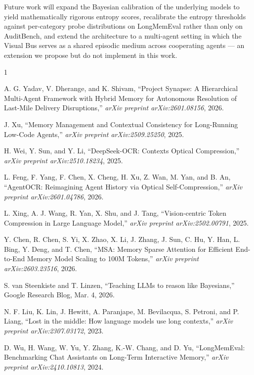 \documentclass[conference]{IEEEtran}
\begin{document}
Future work will expand the Bayesian calibration of the underlying models to yield mathematically rigorous entropy scores, recalibrate the entropy thresholds against per-category probe distributions on LongMemEval rather than only on AuditBench, and extend the architecture to a multi-agent setting in which the Visual Bus serves as a shared episodic medium across cooperating agents --- an extension we propose but do not implement in this work.


\begin{thebibliography}{1}

    A. G. Yadav, V. Dherange, and K. Shivam, ``Project Synapse: A Hierarchical Multi-Agent Framework with Hybrid Memory for Autonomous Resolution of Last-Mile Delivery Disruptions,'' \textit{arXiv preprint arXiv:2601.08156}, 2026.

    J. Xu, ``Memory Management and Contextual Consistency for Long-Running Low-Code Agents,'' \textit{arXiv preprint arXiv:2509.25250}, 2025.

    H. Wei, Y. Sun, and Y. Li, ``DeepSeek-OCR: Contexts Optical Compression,'' \textit{arXiv preprint arXiv:2510.18234}, 2025.

    L. Feng, F. Yang, F. Chen, X. Cheng, H. Xu, Z. Wan, M. Yan, and B. An, ``AgentOCR: Reimagining Agent History via Optical Self-Compression,'' \textit{arXiv preprint arXiv:2601.04786}, 2026.

    L. Xing, A. J. Wang, R. Yan, X. Shu, and J. Tang, ``Vision-centric Token Compression in Large Language Model,'' \textit{arXiv preprint arXiv:2502.00791}, 2025.

    Y. Chen, R. Chen, S. Yi, X. Zhao, X. Li, J. Zhang, J. Sun, C. Hu, Y. Han, L. Bing, Y. Deng, and T. Chen, ``MSA: Memory Sparse Attention for Efficient End-to-End Memory Model Scaling to 100M Tokens,'' \textit{arXiv preprint arXiv:2603.23516}, 2026.

    S. van Steenkiste and T. Linzen, ``Teaching LLMs to reason like Bayesians,'' Google Research Blog, Mar. 4, 2026.

    N. F. Liu, K. Lin, J. Hewitt, A. Paranjape, M. Bevilacqua, S. Petroni, and P. Liang, ``Lost in the middle: How language models use long contexts,'' \textit{arXiv preprint arXiv:2307.03172}, 2023.

    D. Wu, H. Wang, W. Yu, Y. Zhang, K.-W. Chang, and D. Yu, ``LongMemEval: Benchmarking Chat Assistants on Long-Term Interactive Memory,'' \textit{arXiv preprint arXiv:2410.10813}, 2024.


\end{thebibliography}
\end{document}
